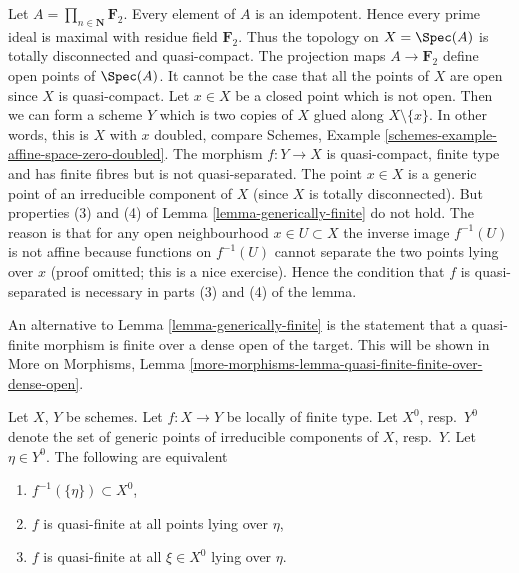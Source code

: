 \begin{example}
\label{example-counter-generically-finite}
Let $A = \prod_{n \in \mathbf{N}} \mathbf{F}_2$.
Every element of $A$ is an idempotent. Hence every prime ideal is maximal
with residue field $\mathbf{F}_2$.
Thus the topology on $X = \Spec(A)$ is totally disconnected
and quasi-compact. The projection maps $A \to \mathbf{F}_2$ define open
points of $\Spec(A)$. It cannot be the case that all the points
of $X$ are open since $X$ is quasi-compact. Let $x \in X$ be a closed
point which is not open. Then we can form a scheme $Y$ which is two
copies of $X$ glued along $X \setminus \{x\}$. In other words, this
is $X$ with $x$ doubled, compare
Schemes, Example \ref{schemes-example-affine-space-zero-doubled}.
The morphism
$f : Y \to X$ is quasi-compact, finite type and has finite fibres
but is not quasi-separated.
The point $x \in X$ is a generic point of an irreducible component
of $X$ (since $X$ is totally disconnected). But properties (3) and (4)
of Lemma \ref{lemma-generically-finite} do not hold. The reason is that
for any open neighbourhood $x \in U \subset X$ the inverse image
$f^{-1}(U)$ is not affine because functions on $f^{-1}(U)$ cannot
separate the two points lying over $x$ (proof omitted; this is a
nice exercise). Hence the condition that $f$ is quasi-separated is
necessary in parts (3) and (4) of the lemma.
\end{example}

\begin{remark}
\label{remark-quasi-finite-finite-over-dense-open}
An alternative to
Lemma \ref{lemma-generically-finite}
is the statement that a quasi-finite morphism is finite
over a dense open of the target. This will be shown in
More on Morphisms,
Lemma \ref{more-morphisms-lemma-quasi-finite-finite-over-dense-open}.
\end{remark}

\begin{lemma}
\label{lemma-quasi-finiteness-over-generic-point}
Let $X$, $Y$ be schemes. Let $f : X \to Y$ be locally of finite type.
Let $X^0$, resp.\ $Y^0$ denote the set of generic points of irreducible
components of $X$, resp.\ $Y$. Let $\eta \in Y^0$. The following are
equivalent
\begin{enumerate}
\item $f^{-1}(\{\eta\}) \subset X^0$,
\item $f$ is quasi-finite at all points lying over $\eta$,
\item $f$ is quasi-finite at all $\xi \in X^0$ lying over $\eta$.
\end{enumerate}
\end{lemma}

